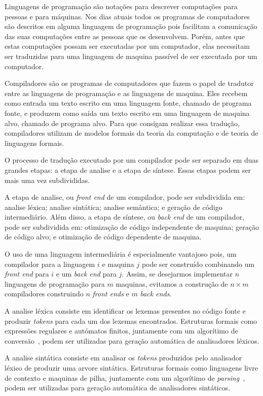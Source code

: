 \documentclass[
  12pt,
  openright,
  twoside,
  a4paper,
  english,
  brazil
]{abntex2}
\begin{document}
Linguagens de programação são notações para descrever computações para pessoas e para máquinas.
Nos dias atuais todos os programas de computadores são descritos em alguma linguagem de programação
pois facilitam a comunicação das suas computações entre as pessoas que os desenvolvem.
Porém, antes que estas computações possam ser executadas por um computador,
elas necessitam ser traduzidas para uma linguagem de maquina passível de ser executada por um computador.

Compiladores são os programas de computadores que fazem o papel de tradutor entre as linguagens de programação e as linguagens de maquina.
Eles recebem como entrada um texto escrito em uma linguagem fonte, chamado de programa fonte, e produzem como saída um texto escrito em uma linguagem de maquina alvo, chamado de programa alvo.
Para que consigam realizar essa tradução, compiladores utilizam de modelos formais da teoria da computação e de teoria de linguagens formais.

O processo de tradução executado por um compilador pode ser separado em duas grandes etapas: a etapa de analise e a etapa de síntese.
Essas etapas podem ser mais uma vez subdivididas.

A etapa de analise, ou \textit{front end} de um compilador, pode ser subdividida em: analise léxica; analise sintática; analise semântica; e geração de código intermediário.
Além disso, a etapa de síntese, ou \textit{back end} de um compilador, pode ser subdividida em: otimização de código independente de maquina; geração de código alvo; e otimização de código dependente de maquina.

O uso de uma linguagem intermediária é especialmente vantajoso pois, um compilador para a linguagem $i$ e maquina $j$ pode ser construído combinando um \textit{front end} para $i$ e um \textit{back end} para $j$.
Assim, se desejarmos implementar $n$ linguagens de programação para $m$ maquinas, evitamos a construção de $n \times m$ compiladores construindo $n$ \textit{front ends} e $m$ \textit{back ends}.

A analise léxica consiste em identificar os lexemas presentes no código fonte e produzir \textit{tokens} para cada um dos lexemas encontrados.
Estruturas formais como expressões regulares e autómatos finitos, juntamente com um algorítimo de conversão~\cite{lesk1975lex}, podem ser utilizadas para geração automática de analisadores léxicos.

A analise sintática consiste em analisar os \textit{tokens} produzidos pelo analisador léxico de produzir uma arvore sintática.
Estruturas formais como linguagens livre de contexto e maquinas de pilha, juntamente com um algorítimo de \textit{parsing}~\cite{knuth1965translation}, podem ser utilizadas para geração automática de analisadores sintáticos.
\end{document}
